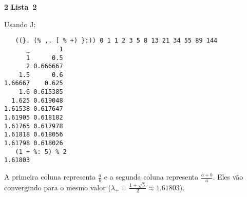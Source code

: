\documentclass{article}
\newcounter{exe-list}
\newenvironment{exe-list}
    {\begin{list}{(\alph{exe-list})}{\usecounter{exe-list}}}
    {\end{list}}
\newenvironment{exe}[2][Sala]
    {\bigskip\noindent\par\ifthenelse{\equal{#1}{}}%
        {\textbf{\LARGE #2}}%
        {\textbf{\LARGE #1~#2}}%
    \medskip\noindent\par}
    {\bigskip}
\begin{document}
\begin{exe}[Lista]{2}
\begin{exe-list}
        \item
            Usando J:
            \begin{verbatim}
   ((}. (% ,. [ % +) }:)) 0 1 1 2 3 5 8 13 21 34 55 89 144
      _        1
      1      0.5
      2 0.666667
    1.5      0.6
1.66667    0.625
    1.6 0.615385
  1.625 0.619048
1.61538 0.617647
1.61905 0.618182
1.61765 0.617978
1.61818 0.618056
1.61798 0.618026
   (1 + %: 5) % 2
1.61803
            \end{verbatim}
            A primeira coluna representa \(\frac{a}{b}\) e
            a segunda coluna representa \(\frac{a+b}{a}\).
            Eles vão convergindo para o mesmo valor
            (\(\lambda_+ = \frac{1 + \sqrt{5}}{2} \approx 1.61803\)).
    \end{exe-list}
\end{exe}
\end{document}
